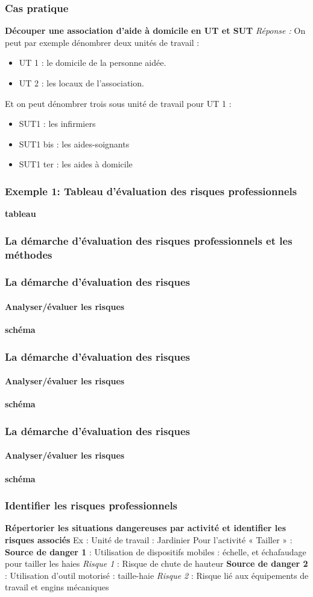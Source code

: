 \documentclass{beamer}
\begin{document}
\begin{frame}
\frametitle{Cas pratique}
\textbf{Découper une association d’aide à domicile en UT et SUT}
\textit{Réponse : }
On peut par exemple dénombrer deux unités de travail :
\begin{itemize}
\item UT 1 : le domicile de la personne aidée.
\item UT 2 : les locaux de l’association.
\end{itemize}
Et on peut dénombrer trois sous unité de travail pour UT 1 :
\begin{itemize}
\item SUT1 : les infirmiers
\item SUT1 bis : les aides-soignants
\item SUT1 ter : les aides à domicile
\end{itemize}
\end{frame}

\begin{frame}
\frametitle{Exemple 1: Tableau d’évaluation des risques professionnels}
\textbf{tableau}
\end{frame}

\begin{frame}
\frametitle{La démarche d’évaluation des risques professionnels et les méthodes}
\end{frame}

\begin{frame}
\frametitle{La démarche d’évaluation des risques}
\framesubtitle{Analyser/évaluer les risques}
\textbf{schéma}
\end{frame}

\begin{frame}
\frametitle{La démarche d’évaluation des risques}
\framesubtitle{Analyser/évaluer les risques}
\textbf{schéma}
\end{frame}

\begin{frame}
\frametitle{La démarche d’évaluation des risques}
\framesubtitle{Analyser/évaluer les risques}
\textbf{schéma}
\end{frame}

\begin{frame}
\frametitle{Identifier les risques professionnels}
\textbf{Répertorier les situations dangereuses par activité et identifier les risques associés }
Ex : Unité de travail : Jardinier
Pour l’activité « Tailler » :
\textbf{Source de danger 1} :
Utilisation de dispositifs mobiles : échelle, et échafaudage pour tailler les haies
\textit{Risque 1} : Risque de chute de hauteur
\textbf{Source de danger 2} : 
Utilisation d’outil motorisé : taille-haie
\textit{Risque 2} : Risque lié aux équipements de travail et engins mécaniques  
\end{frame}
\end{document}

